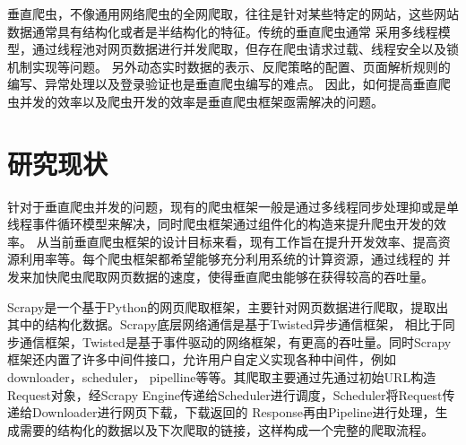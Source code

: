 \documentclass[master]{njuthesis}
\begin{document}
垂直爬虫，不像通用网络爬虫的全网爬取，往往是针对某些特定的网站，这些网站数据通常具有结构化或者是半结构化的特征。传统的垂直爬虫通常
采用多线程模型\cite{shrivastava2018methodical}，通过线程池对网页数据进行并发爬取，但存在爬虫请求过载、线程安全以及锁机制实现等问题。
另外动态实时数据的表示、反爬策略的配置、页面解析规则的编写、异常处理以及登录验证也是垂直爬虫编写的难点\cite{desai2017web}。
因此，如何提高垂直爬虫并发的效率以及爬虫开发的效率是垂直爬虫框架亟需解决的问题。





\section{研究现状}
针对于垂直爬虫并发的问题，现有的爬虫框架一般是通过多线程同步处理抑或是单线程事件循环模型来解决，同时爬虫框架通过组件化的构造来提升爬虫开发的效率。
从当前垂直爬虫框架的设计目标来看，现有工作旨在提升开发效率、提高资源利用率等。每个爬虫框架都希望能够充分利用系统的计算资源，通过线程的
并发来加快爬虫爬取网页数据的速度，使得垂直爬虫能够在获得较高的吞吐量。

  Scrapy\cite{scrapy}是一个基于Python的网页爬取框架，主要针对网页数据进行爬取，提取出其中的结构化数据。Scrapy底层网络通信是基于Twisted异步通信框架，
  相比于同步通信框架，Twisted是基于事件驱动的网络框架，有更高的吞吐量。同时Scrapy框架还内置了许多中间件接口，允许用户自定义实现各种中间件，例如downloader，scheduler，
  pipelline等等。其爬取主要通过先通过初始URL构造Request对象，经Scrapy Engine传递给Scheduler进行调度，Scheduler将Request传递给Downloader进行网页下载，下载返回的
  Response再由Pipeline进行处理，生成需要的结构化的数据以及下次爬取的链接，这样构成一个完整的爬取流程。
\end{document}
